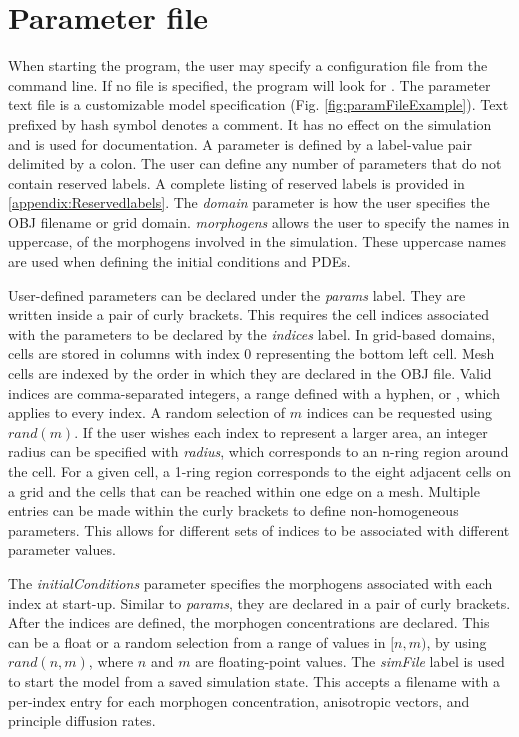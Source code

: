 \section{Parameter file}
When starting the program, the user may specify a configuration file from the command line. If no file is specified, the program will look for . The parameter text file is a customizable model specification (Fig. \ref{fig:paramFileExample}). Text prefixed by hash symbol denotes a comment. It has no effect on the simulation and is used for documentation. A parameter is defined by a label-value pair delimited by a colon. The user can define any number of parameters that do not contain reserved labels. A complete listing of reserved labels is provided in \ref{appendix:Reservedlabels}. The \textit{domain} parameter is how the user specifies the OBJ filename or grid domain. \textit{morphogens} allows the user to specify the names in uppercase, of the morphogens involved in the simulation. These uppercase names are used when defining the initial conditions and PDEs.

User-defined parameters can be declared under the \textit{params} label. They are written inside a pair of curly brackets. This requires the cell indices associated with the parameters to be declared by the \textit{indices} label. In grid-based domains, cells are stored in columns with index 0 representing the bottom left cell. Mesh cells are indexed by the order in which they are declared in the OBJ file. Valid indices are comma-separated integers, a range defined with a hyphen, or , which applies to every index. A random selection of $m$ indices can be requested using $rand(m)$. If the user wishes each index to represent a larger area, an integer radius can be specified with \textit{radius}, which corresponds to an n-ring region around the cell. For a given cell, a 1-ring region corresponds to the eight adjacent cells on a grid and the cells that can be reached within one edge on a mesh. Multiple entries can be made within the curly brackets to define non-homogeneous parameters. This allows for different sets of indices to be associated with different parameter values.

The \textit{initialConditions} parameter specifies the morphogens associated with each index at start-up. Similar to \textit{params}, they are declared in a pair of curly brackets. After the indices are defined, the morphogen concentrations are declared. This can be a float or a random selection from a range of values in $[n, m)$, by using $rand(n, m)$, where $n$ and $m$ are floating-point values. The \textit{simFile} label is used to start the model from a saved simulation state. This accepts a filename with a per-index entry for each morphogen concentration, anisotropic vectors, and principle diffusion rates.

